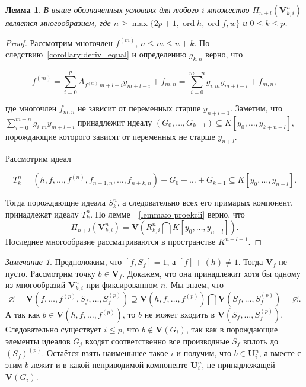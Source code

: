 \documentclass[16pt]{article}
\DeclareMathOperator{\ord}{ord}
\theoremstyle{plain}
\newtheorem{lemma}[theorem]{Лемма}
\theoremstyle{definition}
\theoremstyle{remark}
\newtheorem{remark}[theorem]{Замечание}
\begin{document}
\begin{lemma} \label{lemma:o_ideale}
 В выше обозначенных условиях для любого $i$ множество $\Pi_{n+l}(\mathbf{V}_{k,i}^n)$ является многообразием, где $n \geqslant\max\{ 2p+1,\ord{h},\ord{f},w\}$ и  $0\leqslant k\leqslant p$.
\end{lemma}

\begin{proof}
Рассмотрим многочлен $ f^{(m)}$, $n\leqslant m\leqslant n+k$. По следствию~\ref{corollary:deriv_equal} и определению $g_{k,n}$ верно, что

$$
f^{(m)}= \sum\limits_{i=0}^{p} A_{f^{(m)}\,m+l -i}y_{m+l -i} + f_{m,n}=\sum\limits_{i=0}^{m-n} g_{i,m}y_{m+l -i} + f_{m,n},
$$

где многочлен $f_{m,n}$ не зависит от переменных старше $y_{n+l-1}$. Заметим, что $\sum\limits_{i=0}^{m-n} g_{i,m}y_{m+l -i}$ принадлежит идеалу  $(G_0,\ldots, G_{k-1})\subseteq K[y_0,\ldots,y_{k+n+l}]$,  порождающие которого зависят от переменных не старше $y_{n+l}$.

Рассмотрим идеал

$$
T_k^n=(h,f,\ldots,f^{(n)},f_{n+1,n},\ldots,f_{n+k,n}) + G_0+\ldots+ G_{k-1}\subseteq K[y_0,\ldots,y_{n+l}].
$$

Тогда порождающие идеала $S_k^n$, а следовательно всех его примарых компонент, принадлежат идеалу $T_k^n$. По лемме~~\ref{lemma:o proekcii} верно, что
$$
\Pi_{n+l}(\mathbf{V}_{k,i}^n)=\mathbf{V}(R_{k,i}^n\bigcap K[y_0,\ldots,y_{n+l}]).
$$
Последнее многообразие рассматриваются в пространстве $K^{n+l+1}$.
\end{proof}


\begin{remark}\label{remark:o_prinadleznosti_reshenia}
Предположим, что $[f,S_f]=1$, а $[f]+(h)\neq 1$. Тогда $\mathbf{V}_{f}$ не пусто. Рассмотрим точку $b\in\mathbf{V}_{f}$. Докажем, что она принадлежит хотя бы одному из многообразий $\mathbf{V}_{k,i}^n$ при фиксированном $n$. Мы знаем, что 
$$
\varnothing=\mathbf{V}(f,\ldots,f^{(p)},S_f,\ldots,S_f^{(p)})\supseteq \mathbf{V}(h,f,\ldots,f^{(p)})\bigcap\mathbf{V}(S_f,\ldots,S_f^{(p)})=\varnothing.
$$
 А так как $b\in \mathbf{V}(h,f,\ldots,f^{(p)})$, то $b$ не может входить в $\mathbf{V}(S_f,\ldots,S_f^{(p)})$. Следовательно существует $i\leqslant p$, что $b \not\in \mathbf{V}(G_i)$, так как  в порождающие элементы идеалов $G_j$ входят соответственно все производные $S_f$ вплоть до $(S_f)^{(p)}$. Остаётся взять наименьшее такое $i$ и получим, что $b\in \mathbf{U}_{i}^n$, а вместе с этим $b$ лежит и в какой неприводимой компоненте $\mathbf{U}_{i}^n$, не принадлежащей $\mathbf{V}(G_{i})$.
\end{remark}
\end{document}
